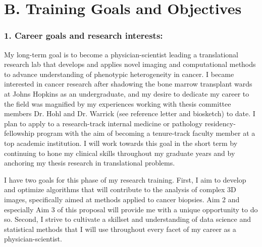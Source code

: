 \documentclass{NIHGrant}
\begin{document}
\section*{B. Training Goals and Objectives}
\subsubsection*{1. Career goals and research interests:}
My long-term goal is to become a physician-scientist leading a translational research lab that develops and applies novel imaging and computational methods to advance understanding of phenotypic heterogeneity in cancer. I became interested in cancer research after shadowing the bone marrow transplant wards at Johns Hopkins as an undergraduate, and my desire to dedicate my career to the field was magnified by my experiences working with thesis committee members Dr. Hohl and Dr. Warrick (see reference letter and biosketch) to date. I plan to apply to a research-track internal medicine or pathology residency-fellowship program with the aim of becoming a tenure-track faculty member at a top academic institution. I will work towards this goal in the short term by continuing to hone my clinical skills throughout my graduate years and by anchoring my thesis research in translational problems.

I have two goals for this phase of my research training. First, I aim to develop and optimize algorithms that will contribute to the analysis of complex 3D images, specifically aimed at methods applied to cancer biopsies. Aim 2 and especially Aim 3 of this proposal will provide me with a unique opportunity to do so. Second, I strive to cultivate a  skillset and understanding of data science and statistical methods that I will use throughout every facet of my career as a physician-scientist.
\end{document}
